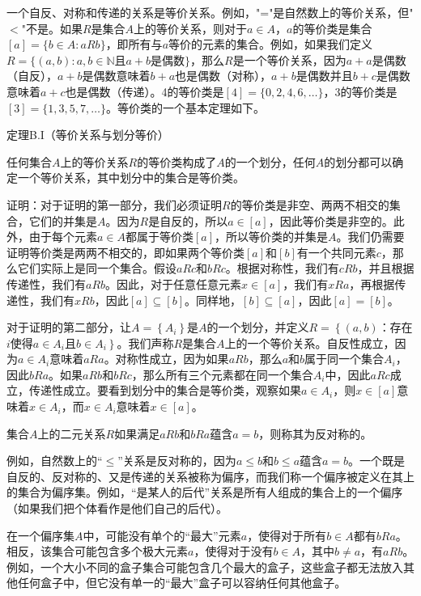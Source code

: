\documentclass[lang=cn,newtx,10pt,scheme=chinese]{elegantbook}
\begin{document}
一个自反、对称和传递的关系是等价关系。例如，"="是自然数上的等价关系，但"$<$"不是。如果$R$是集合$A$上的等价关系，则对于$a \in A$，$a$的等价类是集合$[a]=\{b \in A: a R b\}$，即所有与$a$等价的元素的集合。例如，如果我们定义$R=\{(a, b): a, b \in \mathbb{N}$且$a+b$是偶数$\}$，那么$R$是一个等价关系，因为$a+a$是偶数（自反），$a+b$是偶数意味着$b+a$也是偶数（对称），$a+b$是偶数并且$b+c$是偶数意味着$a+c$也是偶数（传递）。4的等价类是$[4]=\{0,2,4,6, \ldots\}$，3的等价类是$[3]=\{1,3,5,7, \ldots\}$。等价类的一个基本定理如下。

定理B.I（等价关系与划分等价）

任何集合$A$上的等价关系$R$的等价类构成了$A$的一个划分，任何$A$的划分都可以确定一个等价关系，其中划分中的集合是等价类。

证明：对于证明的第一部分，我们必须证明$R$的等价类是非空、两两不相交的集合，它们的并集是$A$。因为$R$是自反的，所以$a \in[a]$，因此等价类是非空的。此外，由于每个元素$a \in A$都属于等价类$[a]$，所以等价类的并集是$A$。我们仍需要证明等价类是两两不相交的，即如果两个等价类$[a]$和$[b]$有一个共同元素$c$，那么它们实际上是同一个集合。假设$a R c$和$b R c$。根据对称性，我们有$c R b$，并且根据传递性，我们有$a R b$。因此，对于任意任意元素$x \in[a]$，我们有$x R a$，再根据传递性，我们有$x R b$，因此$[a] \subseteq[b]$。同样地，$[b] \subseteq[a]$，因此$[a]=[b]$。

对于证明的第二部分，让$A=\left\{A_i\right\}$是$A$的一个划分，并定义$R=\left\{(a, b)\right.$：存在$i$使得$a \in A_i$且$\left.b \in A_i\right\}$。我们声称$R$是集合$A$上的一个等价关系。自反性成立，因为$a \in A_i$意味着$a R a$。对称性成立，因为如果$a R b$，那么$a$和$b$属于同一个集合$A_i$，因此$b R a$。如果$a R b$和$b R c$，那么所有三个元素都在同一个集合$A_i$中，因此$a R c$成立，传递性成立。要看到划分中的集合是等价类，观察如果$a \in A_i$，则$x \in[a]$意味着$x \in A_i$，而$x \in A_i$意味着$x \in[a]$。

集合$A$上的二元关系$R$如果满足$a R b$和$b R a$蕴含$a=b$，则称其为反对称的。

例如，自然数上的“$\leq$”关系是反对称的，因为$a \leq b$和$b \leq a$蕴含$a=b$。一个既是自反的、反对称的、又是传递的关系被称为偏序，而我们称一个偏序被定义在其上的集合为偏序集。例如，“是某人的后代”关系是所有人组成的集合上的一个偏序（如果我们把个体看作是他们自己的后代）。

在一个偏序集$A$中，可能没有单个的“最大”元素$a$，使得对于所有$b \in A$都有$b R a$。相反，该集合可能包含多个极大元素$a$，使得对于没有$b \in A$，其中$b \neq a$，有$a R b$。例如，一个大小不同的盒子集合可能包含几个最大的盒子，这些盒子都无法放入其他任何盒子中，但它没有单一的“最大”盒子可以容纳任何其他盒子。
\end{document}
